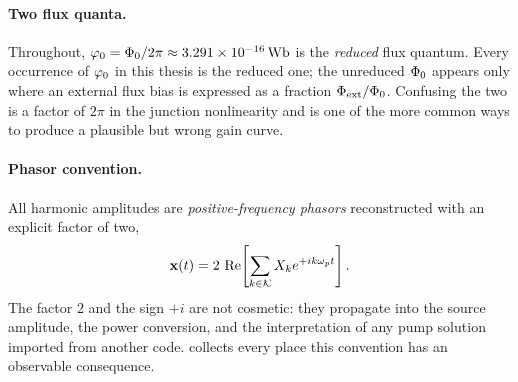 \paragraph{Two flux quanta.} Throughout, $\rphi=\fluxquantum/2\pi\approx
\SI{3.291e-16}{\weber}$ is the \emph{reduced} flux quantum. Every occurrence of
$\varphi_{0}$ in this thesis is the reduced one; the unreduced $\Phi_{0}$ appears
only where an external flux bias is expressed as a fraction $\Phi_{\mathrm{ext}}
/\Phi_{0}$. Confusing the two is a factor of $2\pi$ in the junction
nonlinearity and is one of the more common ways to produce a plausible but
wrong gain curve.

\paragraph{Phasor convention.} All harmonic amplitudes are
\emph{positive-frequency phasors} reconstructed with an explicit factor of two,
\[
  \mathbf{x}(t) = 2\,\operatorname{Re}\!\left[\sum_{k\in\mathcal{K}} X_k e^{+ik\omega_{p} t}\right].
\]
The factor $2$ and the sign $+i$ are not cosmetic: they propagate into the
source amplitude, the power conversion, and the interpretation of any pump
solution imported from another code.  collects every
place this convention has an observable consequence.
